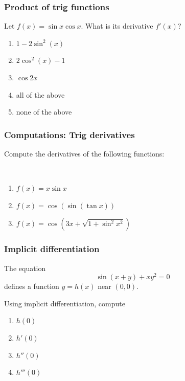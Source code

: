 \documentclass[14pt]{beamer}
\newcommand {\DS} [1] {${\displaystyle #1}$}
\begin{document}
\begin{frame}
\frametitle{Product of trig functions}

Let $f(x)= \sin x \cos x$.  What is its derivative $f'(x)$?

\vfill
\begin{enumerate}
\item $1-2\sin^2(x)$
\item $2\cos^2(x) -1$
\item $\cos 2x$
\item all of the above
\item none of the above
\end{enumerate}

\end{frame}

\begin{frame}[t]
\frametitle{Computations: Trig derivatives}


Compute the derivatives of the following functions:

\
\begin{enumerate}
	\item  \DS{f(x) = x \sin x}


\vfill
	\item  \DS{f(x) = \cos ( \sin( \tan x))}
\vfill
	\item  \DS{f(x) = \cos \left( 3x + \sqrt{1 + \sin^2 x^2 } \right)}
\vfill
\end{enumerate}


\end{frame}

\begin{frame}[t]
\frametitle{Implicit differentiation}

The equation
	$$
		\sin (x+y) + xy^2 = 0
	$$
defines a function \DS{y=h(x)} near $(0,0)$.
\href{https://www.desmos.com/calculator/bvupq00r6s}{}


Using implicit differentiation, compute
	\begin{multicols}{4}
	\begin{enumerate}
		\item \DS{h(0)}
		\item \DS{h'(0)}
		\item \DS{h''(0)}
		\item \DS{h'''(0)}
	\end{enumerate}
	\end{multicols}
\end{frame}
\end{document}
